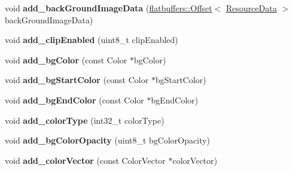 \begin{DoxyCompactItemize}
\mbox{\label{structflatbuffers_1_1ScrollViewOptionsBuilder_aa4493adfb8b68db449d27800aa417de3}} 
void {\bfseries add\+\_\+back\+Ground\+Image\+Data} (\hyperlink{structflatbuffers_1_1Offset}{flatbuffers\+::\+Offset}$<$ \hyperlink{structflatbuffers_1_1ResourceData}{Resource\+Data} $>$ back\+Ground\+Image\+Data)
\item 
\mbox{\label{structflatbuffers_1_1ScrollViewOptionsBuilder_aaed82d7ddcfaae88a3fbd7fa9e99d836}} 
void {\bfseries add\+\_\+clip\+Enabled} (uint8\+\_\+t clip\+Enabled)
\item 
\mbox{\label{structflatbuffers_1_1ScrollViewOptionsBuilder_a49082612098dfe832280e5c1892c6307}} 
void {\bfseries add\+\_\+bg\+Color} (const Color $\ast$bg\+Color)
\item 
\mbox{\label{structflatbuffers_1_1ScrollViewOptionsBuilder_a9286b530abd56e6e50ce6fbee1ebca0a}} 
void {\bfseries add\+\_\+bg\+Start\+Color} (const Color $\ast$bg\+Start\+Color)
\item 
\mbox{\label{structflatbuffers_1_1ScrollViewOptionsBuilder_a7f89c6b73843f8d35f69cb02e6beebf7}} 
void {\bfseries add\+\_\+bg\+End\+Color} (const Color $\ast$bg\+End\+Color)
\item 
\mbox{\label{structflatbuffers_1_1ScrollViewOptionsBuilder_a092191b7f38fa9df3b26e9bbc9d6ae3d}} 
void {\bfseries add\+\_\+color\+Type} (int32\+\_\+t color\+Type)
\item 
\mbox{\label{structflatbuffers_1_1ScrollViewOptionsBuilder_a723f3c4db45b74d75d9cabb6e9b210df}} 
void {\bfseries add\+\_\+bg\+Color\+Opacity} (uint8\+\_\+t bg\+Color\+Opacity)
\item 
\mbox{\label{structflatbuffers_1_1ScrollViewOptionsBuilder_a6d251ae134fafa3ff35477dc19e00bed}} 
void {\bfseries add\+\_\+color\+Vector} (const Color\+Vector $\ast$color\+Vector)
\item 

\end{DoxyCompactItemize}
